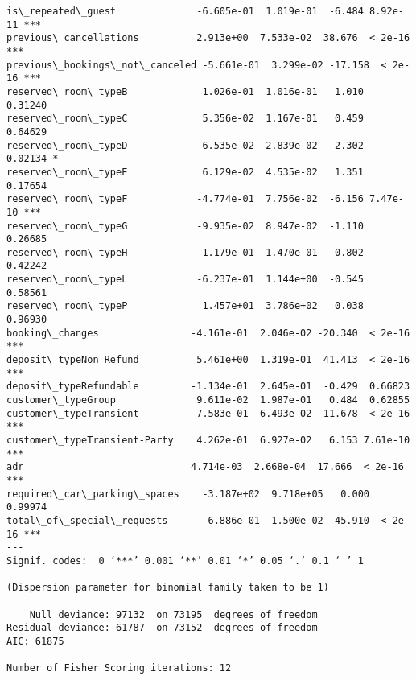 \documentclass[11pt]{article}
\begin{document}
\begin{Verbatim}[commandchars=\\\{\}]
is\_repeated\_guest              -6.605e-01  1.019e-01  -6.484 8.92e-11 ***
previous\_cancellations          2.913e+00  7.533e-02  38.676  < 2e-16 ***
previous\_bookings\_not\_canceled -5.661e-01  3.299e-02 -17.158  < 2e-16 ***
reserved\_room\_typeB             1.026e-01  1.016e-01   1.010  0.31240    
reserved\_room\_typeC             5.356e-02  1.167e-01   0.459  0.64629    
reserved\_room\_typeD            -6.535e-02  2.839e-02  -2.302  0.02134 *  
reserved\_room\_typeE             6.129e-02  4.535e-02   1.351  0.17654    
reserved\_room\_typeF            -4.774e-01  7.756e-02  -6.156 7.47e-10 ***
reserved\_room\_typeG            -9.935e-02  8.947e-02  -1.110  0.26685    
reserved\_room\_typeH            -1.179e-01  1.470e-01  -0.802  0.42242    
reserved\_room\_typeL            -6.237e-01  1.144e+00  -0.545  0.58561    
reserved\_room\_typeP             1.457e+01  3.786e+02   0.038  0.96930    
booking\_changes                -4.161e-01  2.046e-02 -20.340  < 2e-16 ***
deposit\_typeNon Refund          5.461e+00  1.319e-01  41.413  < 2e-16 ***
deposit\_typeRefundable         -1.134e-01  2.645e-01  -0.429  0.66823    
customer\_typeGroup              9.611e-02  1.987e-01   0.484  0.62855    
customer\_typeTransient          7.583e-01  6.493e-02  11.678  < 2e-16 ***
customer\_typeTransient-Party    4.262e-01  6.927e-02   6.153 7.61e-10 ***
adr                             4.714e-03  2.668e-04  17.666  < 2e-16 ***
required\_car\_parking\_spaces    -3.187e+02  9.718e+05   0.000  0.99974    
total\_of\_special\_requests      -6.886e-01  1.500e-02 -45.910  < 2e-16 ***
---
Signif. codes:  0 ‘***’ 0.001 ‘**’ 0.01 ‘*’ 0.05 ‘.’ 0.1 ‘ ’ 1

(Dispersion parameter for binomial family taken to be 1)

    Null deviance: 97132  on 73195  degrees of freedom
Residual deviance: 61787  on 73152  degrees of freedom
AIC: 61875

Number of Fisher Scoring iterations: 12

    \end{Verbatim}

    
    
\end{document}

